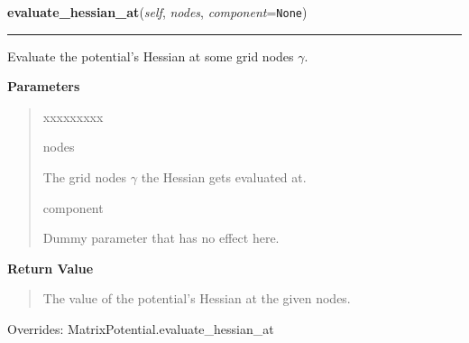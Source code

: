     \vspace{0.5ex}

\hspace{.8\funcindent}\begin{boxedminipage}{\funcwidth}

    \raggedright \textbf{evaluate\_hessian\_at}(\textit{self}, \textit{nodes}, \textit{component}={\tt None})

    \vspace{-1.5ex}

    \rule{\textwidth}{0.5\fboxrule}
\setlength{\parskip}{2ex}
    Evaluate the potential's Hessian at some grid nodes
    $\gamma$.

\setlength{\parskip}{1ex}
      \textbf{Parameters}
      \vspace{-1ex}

      \begin{quote}
        \begin{Ventry}{xxxxxxxxx}

          \item[nodes]

          The grid nodes $\gamma$ the Hessian gets
          evaluated at.

          \item[component]

          Dummy parameter that has no effect here.

        \end{Ventry}

      \end{quote}

      \textbf{Return Value}
    \vspace{-1ex}

      \begin{quote}
      The value of the potential's Hessian at the given nodes.

      \end{quote}

      Overrides: MatrixPotential.evaluate\_hessian\_at

    \end{boxedminipage}

    \vspace{0.5ex}

